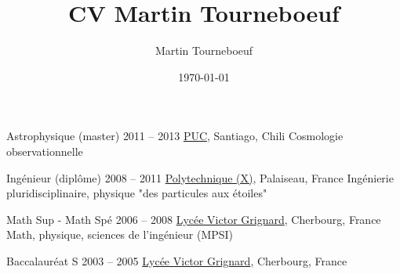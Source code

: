 \def\tbflanguage{french}
\def\tbfbordertop{1}
\def\tbfborderleft{0.7}

\ifx\HCode\undefined

%
\else
%

\fi

\title{CV Martin Tourneboeuf}
\author{Martin Tourneboeuf}
\date{\today}







\begin{coordinatelist}
\end{coordinatelist}




\begin{yearlist}[7.7][\tbfborderleft][4]


\item[Astrophysique (master)]{2011 -- 2013}
  {
  \href{http://www.uc.cl/}{PUC}, Santiago, Chili
  }
  {    Cosmologie observationnelle}


\item[Ingénieur (diplôme)]{2008 -- 2011}
  {
  \tbfix
  \href{https://www.polytechnique.edu/}{Polytechnique (X)}, Palaiseau, France}
  {    Ingénierie pluridisciplinaire, physique "des particules aux étoiles"}


\item[Math Sup - Math Spé]{2006 -- 2008}
  {
  \href{http://www.lycee-grignard.fr/}{Lyc\'ee Victor Grignard}, Cherbourg, France
  }
  {    Math, physique, sciences de l'ingénieur (MPSI)}


\item[Baccalauréat S]{2003 -- 2005}
  {
  \href{http://www.lycee-grignard.fr/}{Lyc\'ee Victor Grignard}, Cherbourg, France
  }
  {\vspace{-0.5cm}}

\end{yearlist}




